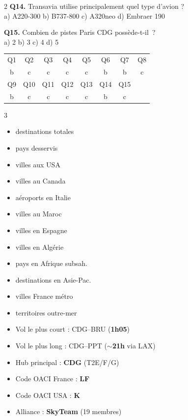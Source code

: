 \documentclass[9pt,a4paper,landscape]{article}
\begin{document}
\begin{multicols}{2}
\textbf{Q14.} Transavia utilise principalement quel type d'avion ?\\
a) A220-300 \quad b) B737-800 \quad c) A320neo \quad d) Embraer 190

\textbf{Q15.} Combien de pistes Paris CDG possède-t-il~?\\
a) 2 \quad b) 3 \quad c) 4 \quad d) 5

\vspace{0.3cm}
\begin{tcolorbox}[colback=afrlight,colframe=afrgreen,title={\textbf{CORRIGÉS}},fonttitle=\bfseries\color{white}]
\begin{tabular}{cccccccc}
Q1 & Q2 & Q3 & Q4 & Q5 & Q6 & Q7 & Q8 \\
b & c & c & c & c & b & b & c \\
\midrule
Q9 & Q10 & Q11 & Q12 & Q13 & Q14 & Q15 & \\
b & c & c & c & c & b & c & \\
\end{tabular}
\end{tcolorbox}

\end{multicols}

\vspace{0.3cm}
\begin{tcolorbox}[colback=aflight,colframe=afblue,title={\textbf{STATISTIQUES RÉSEAU --- À RETENIR POUR LE PSY0}},fonttitle=\bfseries\color{white}]
\begin{multicols}{3}
\scriptsize
\begin{itemize}\setlength\itemsep{0pt}
\item[\textbf{$\sim$200}] destinations totales
\item[\textbf{$\sim$80}] pays desservis
\item[\textbf{19}] villes aux USA
\item[\textbf{5}] villes au Canada
\item[\textbf{14}] aéroports en Italie
\item[\textbf{9}] villes au Maroc
\item[\textbf{14}] villes en Espagne
\item[\textbf{7}] villes en Algérie
\item[\textbf{22}] pays en Afrique subsah.
\item[\textbf{14}] destinations en Asie-Pac.
\item[\textbf{25}] villes France métro
\item[\textbf{4}] territoires outre-mer
\item Vol le plus court : CDG--BRU (\textbf{1h05})
\item Vol le plus long : CDG--PPT (\textbf{$\sim$21h} via LAX)
\item Hub principal : \textbf{CDG} (T2E/F/G)
\item Code OACI France : \textbf{LF}
\item Code OACI USA : \textbf{K}
\item Alliance : \textbf{SkyTeam} (19 membres)
\end{itemize}
\end{multicols}
\end{tcolorbox}
\end{document}
